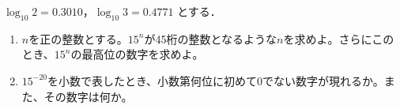\documentclass[8pt,dvipdfmx]{article}[b5paper]
\begin{document}
\begin{tcolorbox}[title=数学\textcircled{\scriptsize 2} 2-7 C]
 $\log_{10}2 = 0.3010$，$\log_{10}3 = 0.4771$ とする．
\begin{enumerate}[(1)]
   \item  $n$を正の整数とする。$15^n$が45桁の整数となるような$n$を求めよ。さらにこのとき、$15^n$の最高位の数字を求めよ。
    \item$15^{-20}$を小数で表したとき、小数第何位に初めて0でない数字が現れるか。また、その数字は何か。
\end{enumerate}
\end{tcolorbox}




\end{document}
